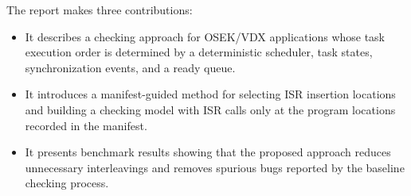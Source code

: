 The report makes three contributions:

\begin{itemize}[leftmargin=1.5em]
\item It describes a checking approach for OSEK/VDX applications whose task execution order is determined by a deterministic scheduler, task states, synchronization events, and a ready queue.

\item It introduces a manifest-guided method for selecting ISR insertion locations and building a checking model with ISR calls only at the program locations recorded in the manifest.

\item It presents benchmark results showing that the proposed approach reduces unnecessary interleavings and removes spurious bugs reported by the baseline checking process.
\end{itemize}
